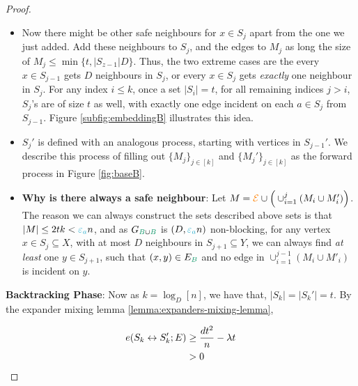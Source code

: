 \documentclass[11pt]{article}
\begin{document}
\begin{proof}
\begin{itemize}
\item{Now there might be other safe neighbours for $x \in S_j$ apart from the one we just added. Add these neighbours to $S_j$, and the edges to $M_j$ as long the size of $M_j \leq \min\{t, |S_{z-1}|D\}$.
    Thus, the two extreme cases are the every $x \in S_{j-1}$ gets $D$ neighbours in $S_j$, or every $x \in S_{j}$ gets \emph{exactly} one neighbour in $S_j$.
For any index $i \leq k$, once a set $|S_i|=t$, for all remaining indices $j > i$, $S_j$'s are of size $t$ as well, with exactly one edge incident on each $a \in S_j$ from $S_{j-1}$. Figure \ref{subfig:embeddingB} illustrates this idea.
  }

\item{$S_{j}'$ is defined with an analogous process, starting with vertices in $S_{j-1}'$. We describe this process of filling out $\{M_j\}_{j \in [k]}$ and $\{M_j'\}_{j \in [k]}$ as the forward process in Figure \ref{fig:baseB}.}
  
\item{\textbf{Why is there always a safe neighbour}: Let $M = \textcolor{orange}{\mathcal{E}} \cup \Big(\cup_{i=1}^{j} (M_i \cup M'_i)\Big)$.
The reason we can always construct the sets described above sets is that $|M| \leq 2tk < \epsilonA n$, and as $\BipartiteG$ is $(D, \epsilonA n)$ non-blocking, for any vertex $x \in S_j \subseteq X$, with at most $D$ neighbours in $S_{j+1} \subseteq Y$, we can always find \emph{at least} one $y \in S_{j+1}$, such that $(x,y) \in E_{\GreenB}$ and no edge in $\cup_{i=1}^{j-1} (M_i \cup M'_i)$ is incident on $y$.}  


\end{itemize}



\textbf{Backtracking Phase}: Now as $k = \log_D[n]$, we have that, $|S_k| = |S_k'|= t$.
By the expander mixing lemma \ref{lemma:expanders-mixing-lemma},

\begin{align}
e(S_k \leftrightarrow S_k'; E)
 &\geq \frac{d t^2}{n} - \lambda t \\
	&> 0 \label{eq:greater}
\end{align}


\end{proof}
\end{document}

